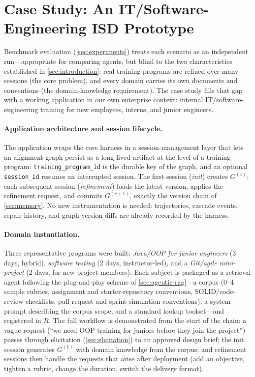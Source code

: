 \section{Case Study: An IT/Software-Engineering ISD Prototype}
\label{sec:case-study}

Benchmark evaluation (\cref{sec:experiments}) treats each scenario as an independent run---appropriate for comparing agents, but blind to the two characteristics established in \cref{sec:introduction}: real training programs are refined over many sessions (the core problem), and every domain carries its own documents and conventions (the domain-knowledge requirement). The case study fills that gap with a working application in our own enterprise context: internal IT/software-engineering training for new employees, interns, and junior engineers.

\paragraph{Application architecture and session lifecycle.}
The application wraps the core harness in a session-management layer that lets an alignment graph persist as a long-lived artifact at the level of a training program: \texttt{training\_program\_id} is the durable key of the graph, and an optional \texttt{session\_id} resumes an interrupted session. The first session (\textsl{init}) creates $G^{(1)}$; each subsequent session (\textsl{refinement}) loads the latest version, applies the refinement request, and commits $G^{(v+1)}$, exactly the version chain of \cref{sec:memory}. No new instrumentation is needed: trajectories, cascade events, repair history, and graph version diffs are already recorded by the harness.

\paragraph{Domain instantiation.}
Three representative programs were built: \emph{Java/OOP for junior engineers} (3 days, hybrid), \emph{software testing} (2 days, instructor-led), and a \emph{Git/agile mini-project} (2 days, for new project members). Each subject is packaged as a retrieval agent following the plug-and-play scheme of \cref{sec:agentic-rag}---a corpus (0--4 sample rubrics, assignment and starter-repository conventions, SOLID/code-review checklists, pull-request and sprint-simulation conventions), a system prompt describing the corpus scope, and a standard lookup toolset---and registered in $R$. The full workflow is demonstrated from the start of the chain: a vague request (``we need OOP training for juniors before they join the project'') passes through elicitation (\cref{sec:elicitation}) to an approved design brief; the init session generates $G^{(1)}$ with domain knowledge from the corpus; and refinement sessions then handle the requests that arise after deployment (add an objective, tighten a rubric, change the duration, switch the delivery format).

